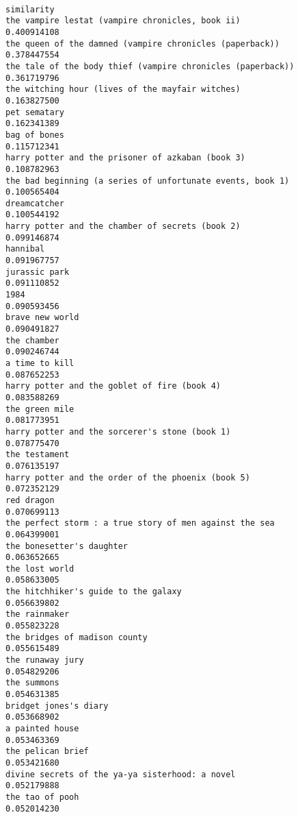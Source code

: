\documentclass[
]{report}
\begin{document}
\begin{verbatim}
                                                             similarity
the vampire lestat (vampire chronicles, book ii)            0.400914108
the queen of the damned (vampire chronicles (paperback))    0.378447554
the tale of the body thief (vampire chronicles (paperback)) 0.361719796
the witching hour (lives of the mayfair witches)            0.163827500
pet sematary                                                0.162341389
bag of bones                                                0.115712341
harry potter and the prisoner of azkaban (book 3)           0.108782963
the bad beginning (a series of unfortunate events, book 1)  0.100565404
dreamcatcher                                                0.100544192
harry potter and the chamber of secrets (book 2)            0.099146874
hannibal                                                    0.091967757
jurassic park                                               0.091110852
1984                                                        0.090593456
brave new world                                             0.090491827
the chamber                                                 0.090246744
a time to kill                                              0.087652253
harry potter and the goblet of fire (book 4)                0.083588269
the green mile                                              0.081773951
harry potter and the sorcerer's stone (book 1)              0.078775470
the testament                                               0.076135197
harry potter and the order of the phoenix (book 5)          0.072352129
red dragon                                                  0.070699113
the perfect storm : a true story of men against the sea     0.064399001
the bonesetter's daughter                                   0.063652665
the lost world                                              0.058633005
the hitchhiker's guide to the galaxy                        0.056639802
the rainmaker                                               0.055823228
the bridges of madison county                               0.055615489
the runaway jury                                            0.054829206
the summons                                                 0.054631385
bridget jones's diary                                       0.053668902
a painted house                                             0.053463369
the pelican brief                                           0.053421680
divine secrets of the ya-ya sisterhood: a novel             0.052179888
the tao of pooh                                             0.052014230

\end{verbatim}
\end{document}
